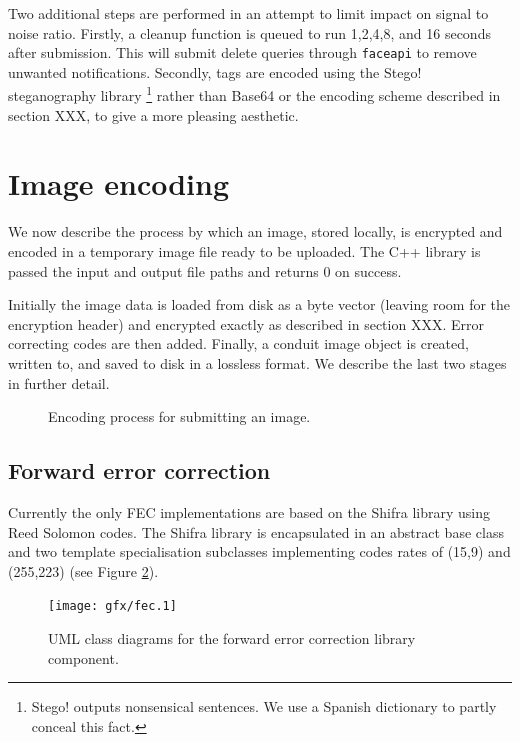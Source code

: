 Two additional steps are performed in an attempt to limit impact on signal to noise ratio. Firstly, a cleanup function is queued to run 1,2,4,8, and 16 seconds after submission. This will submit delete queries through {\tt faceapi} to remove unwanted notifications. Secondly, tags are encoded using the Stego! steganography library \footnote{Stego! outputs nonsensical sentences. We use a Spanish dictionary to partly conceal this fact.} rather than Base64 or the encoding scheme described in section XXX, to give a more pleasing aesthetic.



\FloatBarrier
\section{Image encoding}

We now describe the process by which an image, stored locally, is encrypted and encoded in a temporary image file ready to be uploaded. The C++ library is passed the input and output file paths and returns 0 on success.

Initially the image data is loaded from disk as a byte vector (leaving room for the encryption header) and encrypted exactly as described in section XXX. Error correcting codes are then added. Finally, a conduit image object is created, written to, and saved to disk in a lossless format. We describe the last two stages in further detail.

    \begin{figure}[tb]
        \begin{center}
                
            \caption{Encoding process for submitting an image.}
            \label{tikz:text}
        \end{center}
    \end{figure}


\FloatBarrier
\subsection{Forward error correction}

Currently the only FEC implementations are based on the Shifra library using Reed Solomon codes. The Shifra library is encapsulated in an abstract base class and two template specialisation subclasses implementing codes rates of (15,9) and (255,223) (see Figure \ref{uml:fec}).


    \begin{figure}[tb]
        \begin{center}
                \texttt{[image: gfx/fec.1]}
            \caption{UML class diagrams for the forward error correction library component.}
            \label{uml:fec}
        \end{center}
    \end{figure}

